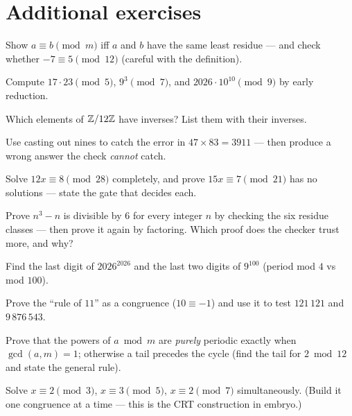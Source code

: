 \section{Additional exercises}
\begin{exercise}[easy]
Show $a \equiv b \pmod m$ iff $a$ and $b$ have the same least residue ---
and check whether $-7 \equiv 5 \pmod{12}$ (careful with the definition).
\end{exercise}
\begin{exercise}[easy]
Compute $17 \cdot 23 \pmod 5$, $9^{3} \pmod 7$, and
$2026 \cdot 10^{10} \pmod 9$ by early reduction.
\end{exercise}
\begin{exercise}[easy]
Which elements of $\mathbb{Z}/12\mathbb{Z}$ have inverses? List them with their inverses.
\end{exercise}
\begin{exercise}[easy]
Use casting out nines to catch the error in $47 \times 83 = 3911$ --- then
produce a wrong answer the check \emph{cannot} catch.
\end{exercise}
\begin{exercise}[medium]
Solve $12x \equiv 8 \pmod{28}$ completely, and prove $15x \equiv 7
\pmod{21}$ has no solutions --- state the gate that decides each.
\end{exercise}
\begin{exercise}[medium]
Prove $n^3 - n$ is divisible by $6$ for every integer $n$ by checking the
six residue classes --- then prove it again by factoring. Which proof does
the checker trust more, and why?
\end{exercise}
\begin{exercise}[medium]
Find the last digit of $2026^{2026}$ and the last two digits of
$9^{100}$ (period mod $4$ vs mod $100$).
\end{exercise}
\begin{exercise}[medium]
Prove the ``rule of $11$'' as a congruence ($10 \equiv -1$) and use it to
test $121\,121$ and $9\,876\,543$.
\end{exercise}
\begin{exercise}[hard]
Prove that the powers of $a \bmod m$ are \emph{purely} periodic exactly when
$\gcd(a,m)=1$; otherwise a tail precedes the cycle (find the tail for
$2 \bmod{12}$ and state the general rule).
\end{exercise}
\begin{exercise}[hard]
Solve $x \equiv 2 \pmod 3$, $x \equiv 3 \pmod 5$, $x \equiv 2 \pmod 7$
simultaneously. (Build it one congruence at a time --- this is the CRT
construction in embryo.)
\end{exercise}
